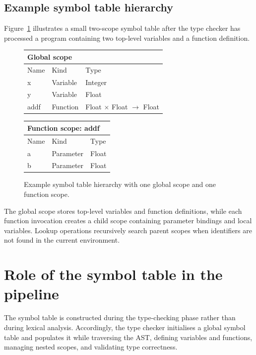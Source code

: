\subsection{Example symbol table hierarchy}
Figure~\ref{fig:symbol-table-example} illustrates a small two-scope symbol
table after the type checker has processed a program containing two top-level
variables and a function definition.

\begin{figure}[H]
\centering
\begin{tcolorbox}[colback=codebg, colframe=codeframe, boxrule=0.4pt,
                  left=6pt, right=6pt, top=4pt, bottom=4pt]
\footnotesize\ttfamily
\begin{tabular}{@{}lll@{}}
\multicolumn{3}{l}{\textbf{Global scope}} \\
\midrule
Name  & Kind     & Type \\
\midrule
x     & Variable & Integer \\
y     & Variable & Float \\
addf  & Function & Float $\times$ Float $\rightarrow$ Float \\
\end{tabular}

\vspace{0.6em}

\begin{tabular}{@{}lll@{}}
\multicolumn{3}{l}{\textbf{Function scope: addf}} \\
\midrule
Name  & Kind      & Type \\
\midrule
a     & Parameter & Float \\
b     & Parameter & Float \\
\end{tabular}
\end{tcolorbox}
\caption{Example symbol table hierarchy with one global scope and one
function scope.}
\label{fig:symbol-table-example}
\end{figure}

The global scope stores top-level variables and function definitions, while
each function invocation creates a child scope containing parameter bindings
and local variables. Lookup operations recursively search parent scopes when
identifiers are not found in the current environment.

\section{Role of the symbol table in the pipeline}
The symbol table is constructed during the type-checking phase rather than
during lexical analysis. Accordingly, the type checker initialises a global
symbol table and populates it while traversing the AST, defining variables and
functions, managing nested scopes, and validating type correctness.

